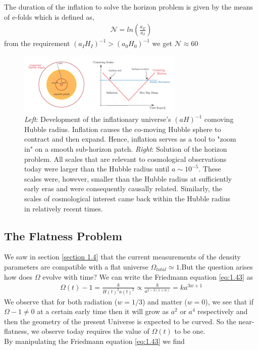 The duration of the inflation to solve the horizon problem is given by the means of e-folds which is defined as,
\begin{align}
    \mathcal{N} = ln \left( \frac{a_E}{a_I} \right)
\end{align} \label{2.1}
from the requirement  $(a_I H_I)^{-1} > (a_0 H_0)^{-1}$ we get $\mathcal{N} \approx 60 $
\begin{figure}[h]
    \centering
    \includegraphics[width=0.7\textwidth]{horizon.png}
    \caption{\emph{Left}: Development of the inflationary universe's $(aH)^{-1}$ comoving Hubble radius. Inflation causes the co-moving Hubble sphere to contract and then expand. Hence, inflation serves as a tool to "zoom in" on a smooth sub-horizon patch. \emph{Right}: Solution of the horizon problem. All scales that are relevant to cosmological observations today were larger than the Hubble radius until $a \sim 10^{-5}$. These scales were, however, smaller than the Hubble radius at sufficiently early eras and were consequently causally related. Similarly, the scales of cosmological interest came back within the Hubble radius in relatively recent times.\cite{baumann2012tasi}}
    \label{fig:2.1} 
\end{figure}

\subsection{The Flatness Problem}
We saw in section \ref{section 1.4} that the current measurements of the density parameters are compatible with a flat universe $\Omega_{total} \simeq 1 $.But the question arises how does $\Omega $ evolve with time?
We can write the Friedmann equation \ref{eq:1.43} as 
\begin{align}
    \Omega(t)-1 = \frac{k}{H(t)^{2} a(t)^{2}} \propto  \frac{k}{a^{2-3(1+w)}} = ka^{3w+1} \label{2.2}
\end{align}
We observe that for both radiation ($w = 1/3$) and matter ($w = 0$), we see that if $\Omega - 1 \neq 0$ at a certain early time then it will grow as $a^2$ or 
$a^4$ respectively and then the geometry of the present Universe is expected to be curved. So the near-flatness, we observe today requires the value of $\Omega(t)$ to be one. \\
By manipulating the Friedmann equation \ref{eq:1.43} we find

